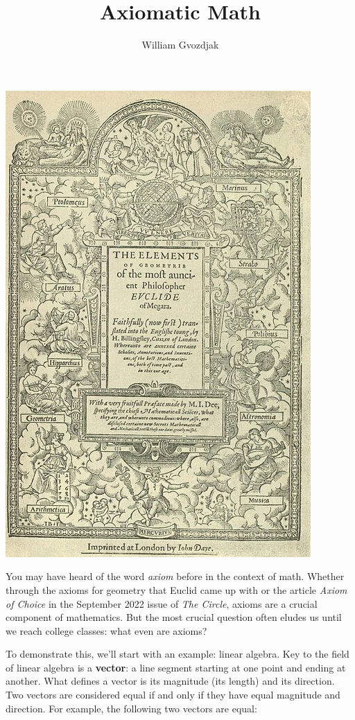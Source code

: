 \documentclass{article}
\title{Axiomatic Math}
\author{William Gvozdjak}
\begin{document}
\maketitle
\begin{center}
\includegraphics[scale=0.25]{images/euclid_elements.jpg}
\end{center}
You may have heard of the word \textit{axiom} before in the context of math. Whether through the axioms for geometry that Euclid came up with or the article \textit{Axiom of Choice} in the September 2022 issue of \textit{The Circle}, axioms are a crucial component of mathematics. But the most crucial question often eludes us until we reach college classes: what even are axioms?

To demonstrate this, we'll start with an example: linear algebra. Key to the field of linear algebra is a \textbf{vector}: a line segment starting at one point and ending at another. What defines a vector is its magnitude (its length) and its direction. Two vectors are considered equal if and only if they have equal magnitude and direction. For example, the following two vectors are equal:
\end{document}
